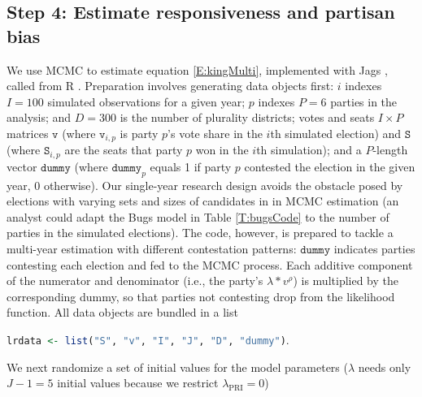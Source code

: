 \documentclass[letter,12pt]{article}
\begin{document}

\subsection*{Step 4: Estimate responsiveness and partisan bias}

We use MCMC to estimate equation \ref{E:kingMulti}, implemented with Jags \citep{jags.cite}, called from R \citep{r.cite}. Preparation involves generating data objects first: $i$ indexes $I=100$ simulated observations for a given year; $p$ indexes $P=6$ parties in the analysis; and $D=300$ is the number of plurality districts; votes and seats $I\times P$ matrices $\texttt{v}$ (where $\texttt{v}_{i,p}$ is party $p$'s vote share in the $i$th simulated election) and $\texttt{S}$ (where $\texttt{S}_{i,p}$ are the seats that party $p$ won in the $i$th simulation); and a $P$-length vector $\texttt{dummy}$ (where $\texttt{dummy}_p$ equals 1 if party $p$ contested the election in the given year, 0 otherwise). Our single-year research design avoids the obstacle posed by elections with varying sets and sizes of candidates in in MCMC estimation (an analyst could adapt the Bugs model in Table \ref{T:bugsCode} to the number of parties in the simulated elections). The code, however, is prepared to tackle a multi-year estimation with different contestation patterns: $\texttt{dummy}$ indicates parties contesting each election and fed to the MCMC process. Each additive component of the numerator and denominator (i.e., the party's $\lambda * v^\rho$) is multiplied by the corresponding dummy, so that parties not contesting drop from the likelihood function. All data objects are bundled in a list 

\begin{center}
\lstinline[language=R]!lrdata <- list("S", "v", "I", "J", "D", "dummy")!.
\end{center}

\noindent We next randomize a set of initial values for the model parameters ($\lambda$ needs only $J-1=5$ initial values because we restrict $\lambda_{\text{PRI}}=0$)
\end{document}
